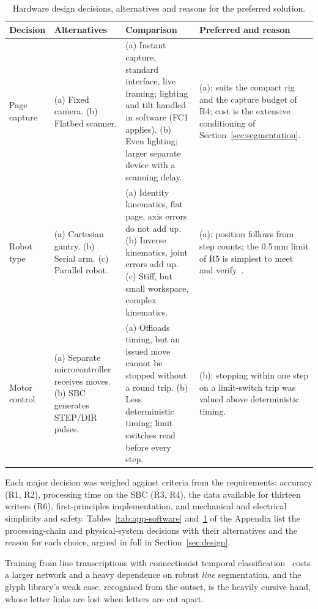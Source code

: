 \begin{table}[htbp]
\centering
\fontsize{9}{10.5}\selectfont
\begin{tabular}{|p{1.6cm}|p{3.4cm}|p{4.3cm}|p{4.3cm}|}
\hline
\textbf{Decision} & \textbf{Alternatives} & \textbf{Comparison} & \textbf{Preferred and reason} \\
\hline
Page capture & (a) Fixed camera. (b) Flatbed scanner. & (a) Instant capture, standard interface, live framing; lighting and tilt handled in software (FC1 applies). (b) Even lighting; larger separate device with a scanning delay. & (a): suits the compact rig and the capture budget of R4; cost is the extensive conditioning of Section~\ref{sec:segmentation}. \\
\hline
Robot type & (a) Cartesian gantry. (b) Serial arm. (c) Parallel robot. & (a) Identity kinematics, flat page, axis errors do not add up. (b) Inverse kinematics, joint errors add up. (c) Stiff, but small workspace, complex kinematics. & (a): position follows from step counts; the 0.5\,mm limit of R5 is simplest to meet and verify~\cite{teikari2016}. \\
\hline
Motor control & (a) Separate microcontroller receives moves. (b) SBC generates STEP/DIR pulses. & (a) Offloads timing, but an issued move cannot be stopped without a round trip. (b) Less deterministic timing; limit switches read before every step. & (b): stopping within one step on a limit-switch trip was valued above deterministic timing. \\
\hline
\end{tabular}
\caption{Hardware design decisions, alternatives and reasons for the preferred solution.}
\label{tab:app-hardware}
\end{table}

\label{sec:app-alternatives}

Each major decision was weighed against criteria from the requirements: accuracy (R1, R2), processing time on the SBC (R3, R4), the data available for thirteen writers (R6), first-principles implementation, and mechanical and electrical simplicity and safety. Tables~\ref{tab:app-software} and~\ref{tab:app-hardware} of the Appendix list the processing-chain and physical-system decisions with their alternatives and the reason for each choice, argued in full in Section~\ref{sec:design}.

Training from line transcriptions with connectionist temporal classification~\cite{graves2006} costs a larger network and a heavy dependence on robust \emph{line} segmentation, and the glyph library's weak case, recognised from the outset, is the heavily cursive hand, whose letter links are lost when letters are cut apart.

